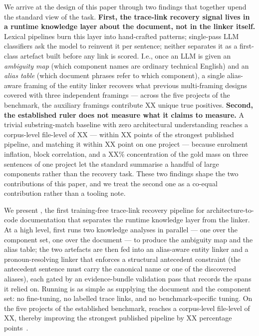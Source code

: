 We arrive at the design of this paper through two findings that together upend the standard view of the task.
\textbf{First, the trace-link recovery signal lives in a runtime knowledge layer about the document, not in the linker itself.}
Lexical pipelines burn this layer into hand-crafted patterns; single-pass \ac{LLM} classifiers ask the model to reinvent it per sentence; neither separates it as a first-class artefact built before any link is scored.
I.e., once an \ac{LLM} is given an \emph{ambiguity map} (which component names are ordinary technical English) and an \emph{alias table} (which document phrases refer to which component), a single alias-aware framing of the entity linker recovers what previous multi-framing designs covered with three independent framings --- across the five projects of the benchmark, the auxiliary framings contribute XX unique true positives.
\textbf{Second, the established ruler does not measure what it claims to measure.}
A trivial substring-match baseline with zero architectural understanding reaches a corpus-level file-level \fone of XX --- within XX points of the strongest published pipeline, and matching it within XX point on one project --- because enrolment inflation, block correlation, and a XX\% concentration of the gold mass on three sentences of one project let the standard \fone summarise a handful of large components rather than the recovery task.
These two findings shape the two contributions of this paper, and we treat the second one as a co-equal contribution rather than a tooling note.

We present \approach, the first training-free trace-link recovery pipeline for architecture-to-code documentation that separates the runtime knowledge layer from the linker.
At a high level, \approach first runs two knowledge analyses in parallel --- one over the component set, one over the document --- to produce the ambiguity map and the alias table; the two artefacts are then fed into an alias-aware entity linker and a pronoun-resolving linker that enforces a structural antecedent constraint (the antecedent sentence must carry the canonical name or one of the discovered aliases), each gated by an evidence-bundle validation pass that records the spans it relied on.
Running \approach is as simple as supplying the document and the component set: no fine-tuning, no labelled trace links, and no benchmark-specific tuning.
On the five projects of the established benchmark, \approach reaches a corpus-level file-level \fone of XX, thereby improving the strongest published pipeline by XX percentage points~\cite{transarc,replication}.

